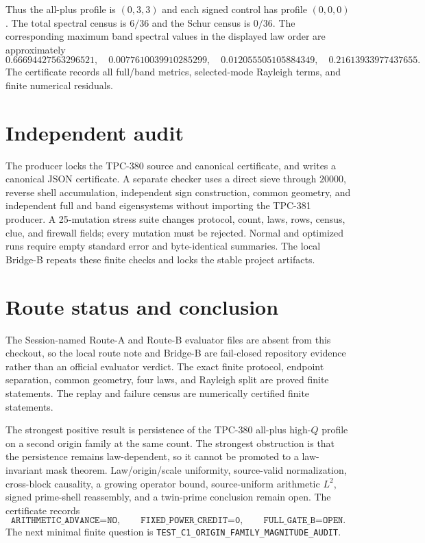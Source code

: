 \documentclass[10pt]{article}
\begin{document}
Thus the all-plus profile is $(0,3,3)$ and each signed control has profile
$(0,0,0)$.  The total spectral census is $6/36$ and the Schur census is
$0/36$.  The corresponding maximum band spectral values in the displayed
law order are approximately
\[
0.66694427563296521,\quad 0.0077610039910285299,\quad
0.012055505105884349,\quad 0.21613933977437655.
\]
The certificate records all full/band metrics, selected-mode Rayleigh terms,
and finite numerical residuals.

\section{Independent audit}

The producer locks the TPC-380 source and canonical certificate, and writes a
canonical JSON certificate.  A separate checker uses a direct sieve through
$20000$, reverse shell accumulation, independent sign construction, common
geometry, and independent full and band eigensystems without importing the
TPC-381 producer.  A 25-mutation stress suite changes protocol, count, laws,
rows, census, clue, and firewall fields; every mutation must be rejected.
Normal and optimized runs require empty standard error and byte-identical
summaries.  The local Bridge-B repeats these finite checks and locks the
stable project artifacts.

\section{Route status and conclusion}

The Session-named Route-A and Route-B evaluator files are absent from this
checkout, so the local route note and Bridge-B are fail-closed repository
evidence rather than an official evaluator verdict.  The exact finite
protocol, endpoint separation, common geometry, four laws, and Rayleigh split
are proved finite statements.  The replay and failure census are numerically
certified finite statements.

The strongest positive result is persistence of the TPC-380 all-plus
high-$Q$ profile on a second origin family at the same count.  The strongest
obstruction is that the persistence remains law-dependent, so it cannot be
promoted to a law-invariant mask theorem.  Law/origin/scale uniformity,
source-valid normalization, cross-block causality, a growing operator bound,
source-uniform arithmetic $L^2$, signed prime-shell reassembly, and a
twin-prime conclusion remain open.  The certificate records
\[
\texttt{ARITHMETIC\_ADVANCE=NO},\qquad
\texttt{FIXED\_POWER\_CREDIT=0},\qquad
\texttt{FULL\_GATE\_B=OPEN}.
\]
The next minimal finite question is
\texttt{TEST\_C1\_ORIGIN\_FAMILY\_MAGNITUDE\_AUDIT}.
\end{document}
